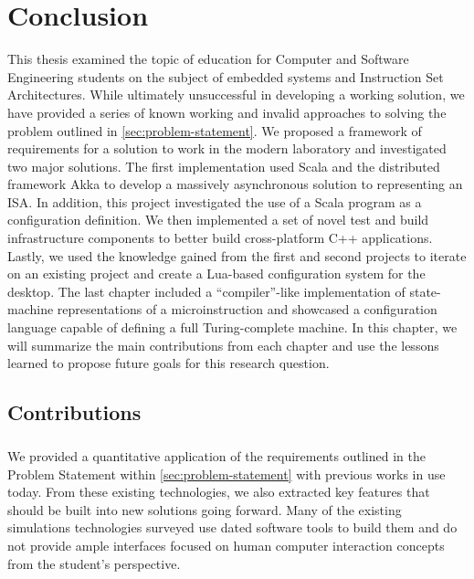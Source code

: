 \chapter{Conclusion}
\label{ch:conclusion}

This thesis examined the topic of education for Computer and Software Engineering students on the subject of embedded systems and Instruction Set Architectures. While ultimately unsuccessful in developing a working solution, we have provided a series of known working and invalid approaches to solving the problem outlined in \cref{sec:problem-statement}. We proposed a framework of requirements for a solution to work in the modern laboratory and investigated two major solutions. The first implementation used Scala and the distributed framework Akka to develop a massively asynchronous solution to representing an ISA. In addition, this project investigated the use of a Scala program as a configuration definition. We then implemented a set of novel test and build infrastructure components to better build cross-platform C++ applications. Lastly, we used the knowledge gained from the first and second projects to iterate on an existing project and create a Lua-based configuration system for the desktop. The last chapter included a ``compiler''-like implementation of state-machine representations of a microinstruction and showcased a configuration language capable of defining a full Turing-complete machine. In this chapter, we will summarize the main contributions from each chapter and use the lessons learned to propose future goals for this research question. 

\section{Contributions}

\paragraph{} We provided a quantitative application of the requirements outlined in the Problem Statement within \cref{sec:problem-statement} with previous works in use today. From these existing technologies, we also extracted key features that should be built into new solutions going forward. Many of the existing simulations technologies surveyed use dated software tools to build them and do not provide ample interfaces focused on human computer interaction concepts from the student's perspective. 


